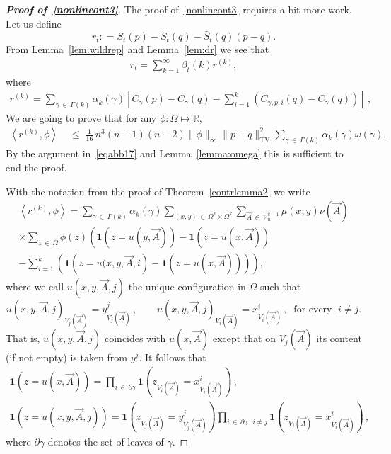 \documentclass[10pt,a4paper]{article}
\renewcommand{\leq}{\;\leqslant\;}
\newcommand{\tv}{\mathrm{TV}}
\newcommand{\ind}{\mathbf{1}}
\newcommand{\cV}{\mathcal{V}}
\newcommand{\bbR}{\mathbb{R}}
\let\b=\beta
\let\g=\gamma
\let\o=\omega
\begin{document}
\begin{proof}[{\bf Proof of~\eqref{nonlincont3}}]
The proof of~\eqref{nonlincont3} requires a bit more work.
Let us define
\[
r_t: = S_t(p) - S_t(q) - \bar{S}_t(q)(p-q).
\]
From Lemma~\ref{lem:wildrep} and Lemma~\ref{lem:dr} we see that
\begin{align}\label{eqa17}
r_t=\sum_{k=1}^\infty \b_t(k) r^{(k)},
\end{align}
where
\begin{align}\label{eqaa17}
r^{(k)}=\sum_{\gamma\,\in\,\Gamma(k)}\alpha_k(\gamma)\left[C_{\gamma}(p)-C_{\gamma}(q)-\sum_{i=1}^k\left(C_{\gamma,p,i}(q)-C_{\gamma}(q)\right)\right]\,,
\end{align}
We are going to prove that for any $\phi:\Omega\mapsto\bbR$,
\begin{align}\label{eq27}
\left\langle r^{(k)},\phi\right\rangle &
\leq \tfrac1{16}\,n^3(n-1)(n-2)\|\phi\|_\infty \|p-q\|^2_{\tv}\sum_{\gamma\,\in\,\Gamma(k)}\alpha_k(\gamma)\o(\g).
\end{align}
By the argument in~\eqref{eqabb17} and Lemma~\ref{lemma:omega} this is sufficient to end the proof.

With the notation from the proof of Theorem~\ref{contrlemma2} we write
\begin{multline}\label{eq28}
\left\langle r^{(k)},\phi\right\rangle=\sum_{\gamma\,\in\,\Gamma(k)}\alpha_k(\gamma)
\sum_{(x,y)\,\in\,\Omega^k\times \Omega^k}\sum_{\vec A\,\in\,\cV_n^{k-1}}\mu(x,y)\nu(\vec A)  \\
\times \sum_{z\,\in\,\Omega} \phi(z)\left(\ind\left(z=u(y,\vec A)\right)-\ind\left(z=u(x,\vec A)\right) 
\right.\\
\left. - \sum_{i=1}^k\left(\ind\left(z=u(x,y,\vec A,i\right) -\ind\left(z=u(x,\vec A)\right) \right)\right),
\end{multline}
where we call $u(x,y,\vec A,j)$ the unique configuration in $\Omega$ such that
\[
u(x,y,\vec A,j)_{V_j(\vec A)} = y^j_{V_j(\vec A)}\,,\qquad u(x,y,\vec A,j)_{V_i(\vec A)} = x^i_{V_i(\vec A)}\,,\;\;\text{for every }\; i\neq j.
\]
That is, $u(x,y,\vec A,j)$ coincides with $u(x,\vec A)$ except that on $V_j(\vec A)$ its content (if not empty) is taken from $y^j$.
It follows that
\begin{gather*}
\ind\left(z=u(x,\vec A)\right) =
\prod_{i\,\in\,\partial \g}
\ind\left(z_{V_i(\vec A)}=x^i_{V_i(\vec A)}\right)\,,\\
\ind\left(z=u\left(x,y,\vec A,j\right)\right) =\ind\left(z_{V_j(\vec A)}=y^j_{V_j(\vec A)}\right)
\prod_{i\,\in\,\partial \g:\; i\neq j}
\ind\left(z_{V_i(\vec A)}=x^i_{V_i(\vec A)}\right)\,,
\end{gather*}
where $\partial\g$ denotes the set of leaves of $\g$.


\end{proof}
\end{document}
